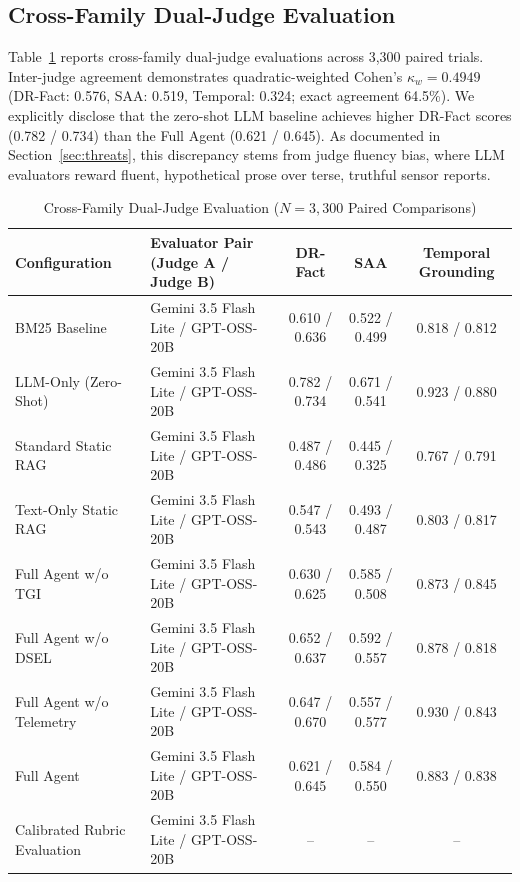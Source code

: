\documentclass[conference]{IEEEtran}
\begin{document}
\subsection{Cross-Family Dual-Judge Evaluation}
Table~\ref{tab:judge} reports cross-family dual-judge evaluations across 3,300 paired trials. Inter-judge agreement demonstrates quadratic-weighted Cohen's $\kappa_w = 0.4949$ (DR-Fact: 0.576, SAA: 0.519, Temporal: 0.324; exact agreement 64.5\%). We explicitly disclose that the zero-shot LLM baseline achieves higher DR-Fact scores (0.782 / 0.734) than the Full Agent (0.621 / 0.645). As documented in Section~\ref{sec:threats}, this discrepancy stems from judge fluency bias, where LLM evaluators reward fluent, hypothetical prose over terse, truthful sensor reports.

\begin{table}[!t]
\caption{Cross-Family Dual-Judge Evaluation ($N=3,300$ Paired Comparisons)}
\label{tab:judge}
\centering
\small
\setlength{\tabcolsep}{8pt}
\begin{tabular*}{\textwidth}{@{\extracolsep{\fill}}llccc@{}}
\toprule
Configuration & Evaluator Pair (Judge A / Judge B) & DR-Fact & SAA & Temporal Grounding \\
\midrule
BM25 Baseline & Gemini 3.5 Flash Lite / GPT-OSS-20B & 0.610 / 0.636 & 0.522 / 0.499 & 0.818 / 0.812 \\
LLM-Only (Zero-Shot) & Gemini 3.5 Flash Lite / GPT-OSS-20B & 0.782 / 0.734 & 0.671 / 0.541 & 0.923 / 0.880 \\
Standard Static RAG & Gemini 3.5 Flash Lite / GPT-OSS-20B & 0.487 / 0.486 & 0.445 / 0.325 & 0.767 / 0.791 \\
Text-Only Static RAG & Gemini 3.5 Flash Lite / GPT-OSS-20B & 0.547 / 0.543 & 0.493 / 0.487 & 0.803 / 0.817 \\
Full Agent w/o TGI & Gemini 3.5 Flash Lite / GPT-OSS-20B & 0.630 / 0.625 & 0.585 / 0.508 & 0.873 / 0.845 \\
Full Agent w/o DSEL & Gemini 3.5 Flash Lite / GPT-OSS-20B & 0.652 / 0.637 & 0.592 / 0.557 & 0.878 / 0.818 \\
Full Agent w/o Telemetry & Gemini 3.5 Flash Lite / GPT-OSS-20B & 0.647 / 0.670 & 0.557 / 0.577 & 0.930 / 0.843 \\
Full Agent & Gemini 3.5 Flash Lite / GPT-OSS-20B & 0.621 / 0.645 & 0.584 / 0.550 & 0.883 / 0.838 \\
\midrule
Calibrated Rubric Evaluation & Gemini 3.5 Flash Lite / GPT-OSS-20B & -- & -- & -- \\
\bottomrule
\end{tabular*}
\end{table}
\end{document}
